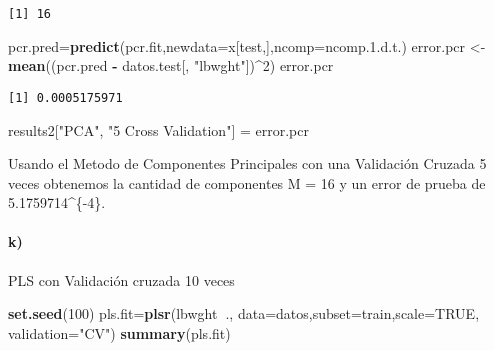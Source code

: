 \documentclass[]{article}
\newenvironment{Shaded}{\begin{snugshade}}{\end{snugshade}}
\newcommand{\KeywordTok}[1]{\textcolor[rgb]{0.13,0.29,0.53}{\textbf{#1}}}
\newcommand{\DataTypeTok}[1]{\textcolor[rgb]{0.13,0.29,0.53}{#1}}
\newcommand{\DecValTok}[1]{\textcolor[rgb]{0.00,0.00,0.81}{#1}}
\newcommand{\FloatTok}[1]{\textcolor[rgb]{0.00,0.00,0.81}{#1}}
\newcommand{\StringTok}[1]{\textcolor[rgb]{0.31,0.60,0.02}{#1}}
\newcommand{\OtherTok}[1]{\textcolor[rgb]{0.56,0.35,0.01}{#1}}
\newcommand{\OperatorTok}[1]{\textcolor[rgb]{0.81,0.36,0.00}{\textbf{#1}}}
\newcommand{\NormalTok}[1]{#1}
\let\oldparagraph\paragraph
\renewcommand{\paragraph}[1]{\oldparagraph{#1}\mbox{}}
\begin{document}
\begin{verbatim}
[1] 16
\end{verbatim}

\begin{Shaded}
\begin{Highlighting}[]
\NormalTok{pcr.pred=}\KeywordTok{predict}\NormalTok{(pcr.fit,}\DataTypeTok{newdata=}\NormalTok{x[test,],}\DataTypeTok{ncomp=}\NormalTok{ncomp.}\FloatTok{1.}\NormalTok{d.t.)}
\NormalTok{error.pcr <-}\StringTok{ }\KeywordTok{mean}\NormalTok{((pcr.pred }\OperatorTok{-}\StringTok{ }\NormalTok{datos.test[, }\StringTok{"lbwght"}\NormalTok{])}\OperatorTok{^}\DecValTok{2}\NormalTok{)}
\NormalTok{error.pcr}
\end{Highlighting}
\end{Shaded}

\begin{verbatim}
[1] 0.0005175971
\end{verbatim}

\begin{Shaded}
\begin{Highlighting}[]
\NormalTok{results2[}\StringTok{"PCA"}\NormalTok{, }\StringTok{"5 Cross Validation"}\NormalTok{] =}\StringTok{ }\NormalTok{error.pcr}
\end{Highlighting}
\end{Shaded}

Usando el Metodo de Componentes Principales con una Validación Cruzada 5
veces obtenemos la cantidad de componentes M = 16 y un error de prueba
de 5.1759714\^{}\{-4\}.

\paragraph{k)}\label{k}

PLS con Validación cruzada 10 veces

\begin{Shaded}
\begin{Highlighting}[]
\KeywordTok{set.seed}\NormalTok{(}\DecValTok{100}\NormalTok{)}
\NormalTok{pls.fit=}\KeywordTok{plsr}\NormalTok{(lbwght}\OperatorTok{~}\NormalTok{., }\DataTypeTok{data=}\NormalTok{datos,}\DataTypeTok{subset=}\NormalTok{train,}\DataTypeTok{scale=}\OtherTok{TRUE}\NormalTok{, }\DataTypeTok{validation=}\StringTok{"CV"}\NormalTok{)}
\KeywordTok{summary}\NormalTok{(pls.fit)}
\end{Highlighting}
\end{Shaded}
\end{document}
